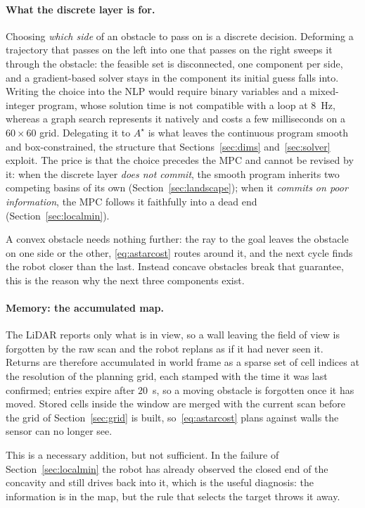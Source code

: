 \documentclass[11pt,a4paper]{article}
\newcommand{\astar}{$A^\star$}
\begin{document}
\paragraph{What the discrete layer is for.} Choosing \emph{which side} of an obstacle to pass on is a
discrete decision. Deforming a trajectory that passes on the left into one that passes on the right
sweeps it through the obstacle: the feasible set is disconnected, one component per side, and a
gradient-based solver stays in the component its initial guess falls into. Writing the choice into the NLP would require
binary variables and a mixed-integer program, whose solution time is not compatible with a loop at $8$~Hz,
whereas a graph search represents it natively and costs a few milliseconds on a $60\times60$ grid.
Delegating it to \astar{} is what leaves the continuous program smooth and box-constrained, the structure
that Sections~\ref{sec:dims} and~\ref{sec:solver} exploit. The price is that the choice precedes the MPC and cannot be revised by it: when the discrete
layer \emph{does not commit}, the smooth program inherits two competing basins of its own
(Section~\ref{sec:landscape}); when it \emph{commits on poor information}, the MPC follows it faithfully
into a dead end (Section~\ref{sec:localmin}).

A convex obstacle needs nothing further: the ray to the goal leaves the obstacle on one side or the other,
\eqref{eq:astarcost} routes around it, and the next cycle finds the robot closer than the last. Instead concave obstacles break that guarantee, this is the reason why the
next three components exist.

\paragraph{Memory: the accumulated map.} The LiDAR reports only what is in view, so a wall leaving the
field of view is forgotten by the raw scan and the robot replans as if it had never seen it. Returns are
therefore accumulated in world frame as a sparse set of cell indices at the resolution of the planning
grid, each stamped with the time it was last confirmed; entries expire after $20$~s, so a moving obstacle
is forgotten once it has moved. Stored cells inside the window are merged with the current scan before the
grid of Section~\ref{sec:grid} is built, so~\eqref{eq:astarcost} plans against walls the sensor can no
longer see.

This is a necessary addition, but not sufficient. In the failure of Section~\ref{sec:localmin} the robot has
already observed the closed end of the concavity and still drives back into it, which is the useful
diagnosis: the information is in the map, but the rule that selects the target throws it away.
\end{document}
